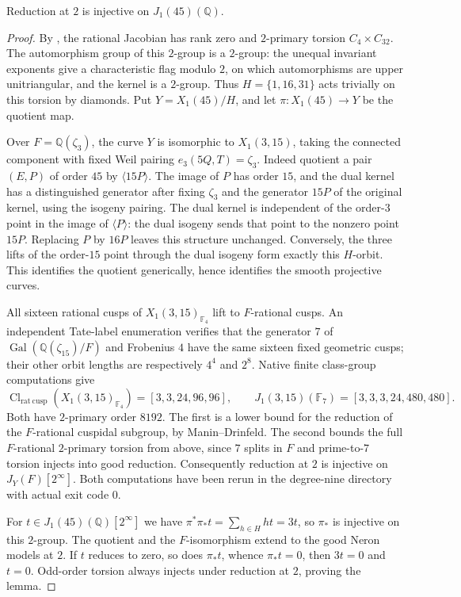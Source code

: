 \begin{lemma}\label{lem:nonic45-injective-two}
Reduction at $2$ is injective on $J_1(45)(\mathbb Q)$.
\end{lemma}
\begin{proof}
By \cite[Theorems~3.1 and 4.13, and Table~2]{DEHMZ}, the rational Jacobian has
rank zero and $2$-primary torsion $C_4\times C_{32}$.
The automorphism group of this $2$-group is a $2$-group: the unequal
invariant exponents give a characteristic flag modulo $2$, on which
automorphisms are upper unitriangular, and the kernel is a $2$-group.
Thus $H=\{1,16,31\}$ acts trivially on this torsion by diamonds.
Put $Y=X_1(45)/H$, and let $\pi:X_1(45)\to Y$ be the quotient map.

Over $F=\mathbb Q(\zeta_3)$, the curve $Y$ is isomorphic to
$X_1(3,15)$, taking the connected component with fixed Weil pairing
$e_3(5Q,T)=\zeta_3$. Indeed quotient a pair $(E,P)$ of order $45$ by
$\langle15P\rangle$. The image of $P$ has order $15$, and the dual
kernel has a distinguished generator after fixing $\zeta_3$ and the
generator $15P$ of the original kernel, using the isogeny pairing.
The dual kernel is independent of the order-$3$ point in the image
of $\langle P\rangle$: the dual isogeny sends that point to the
nonzero point $15P$. Replacing $P$ by $16P$ leaves this structure
unchanged. Conversely, the three lifts of the order-$15$ point through
the dual isogeny form exactly this $H$-orbit. This identifies the
quotient generically, hence identifies the smooth projective curves.

All sixteen rational cusps of $X_1(3,15)_{\mathbb F_4}$ lift to
$F$-rational cusps. An independent Tate-label enumeration verifies
that the generator $7$ of $\operatorname{Gal}(\mathbb Q(\zeta_{15})/F)$
and Frobenius $4$ have the same sixteen fixed geometric cusps;
their other orbit lengths are respectively $4^4$ and $2^8$.
Native finite class-group computations give
\[
 \operatorname{Cl}_{\mathrm{rat\ cusp}}(X_1(3,15)_{\mathbb F_4})
       =[3,3,24,96,96],
 \qquad J_1(3,15)(\mathbb F_7)=[3,3,3,24,480,480].
\]
Both have $2$-primary order $8192$.
The first is a lower bound for the reduction of the $F$-rational
cuspidal subgroup, by Manin--Drinfeld. The second bounds the full
$F$-rational $2$-primary torsion from above, since $7$ splits in $F$
and prime-to-$7$ torsion injects into good reduction.
Consequently reduction at $2$ is injective on $J_Y(F)[2^\infty]$.
Both computations have been rerun in the degree-nine directory with
actual exit code $0$.

For $t\in J_1(45)(\mathbb Q)[2^\infty]$ we have
$\pi^*\pi_*t=\sum_{h\in H}ht=3t$, so $\pi_*$ is injective on this
$2$-group. The quotient and the $F$-isomorphism extend to the good
Neron models at $2$. If $t$ reduces to zero, so does $\pi_*t$, whence
$\pi_*t=0$, then $3t=0$ and $t=0$.
Odd-order torsion always injects under reduction at $2$, proving the lemma.
\end{proof}
